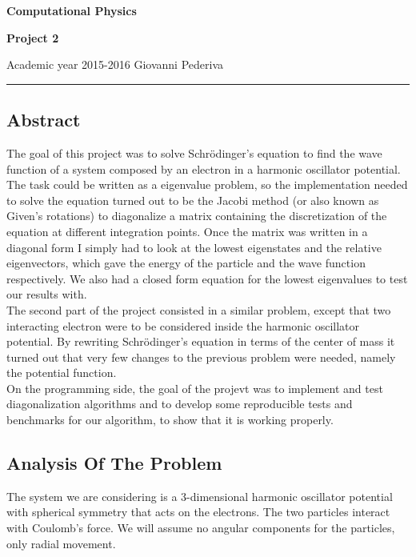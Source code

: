 \documentclass[10pt,a4paper,titlepage]{article}
\begin{document}
\begin{center}
{\LARGE \bfseries Computational Physics\par}
\vspace{0.5cm}
{\LARGE \bfseries Project 2 \par}
\end{center}

\vspace{1cm}

Academic year 2015-2016	 \hfill Giovanni Pederiva     

\begin{center}
\hrule height 2 pt
\end{center} 


\subsection*{Abstract}
The goal of this project was to solve Schr\"odinger's equation to find the wave function of a system composed by an electron in a harmonic oscillator 
potential. The task could be written as a eigenvalue problem, so the implementation needed to solve the equation turned out to be the Jacobi method 
(or also known as Given's rotations) to diagonalize a matrix containing the discretization of the equation at different integration points. Once the 
matrix was written in a diagonal form I simply had to look at the lowest eigenstates and the relative eigenvectors, which gave the energy of the particle 
and the wave function respectively. We also had a closed form equation for the lowest eigenvalues to test our results with.\\
The second part of the project consisted in a similar problem, except that two interacting electron were to be considered inside the harmonic oscillator
potential. By rewriting Schr\"odinger's equation in terms of the center of mass it turned out that very few changes to the previous problem were needed, 
namely the potential function.\\
On the programming side, the goal of the projevt was to implement and test diagonalization algorithms and to develop some reproducible tests and 
benchmarks for our algorithm, to show that it is working properly.

\subsection*{Analysis Of The Problem}
The system we are considering is a 3-dimensional harmonic oscillator potential with spherical symmetry that acts on the electrons. The two particles 
interact with Coulomb's force. We will assume no angular components for the particles, only radial movement.\\
\end{document}
